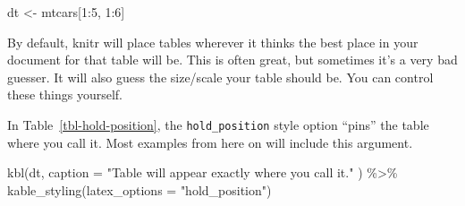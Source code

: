 \documentclass[
  letterpaper,
  DIV=11,
  numbers=noendperiod]{scrartcl}
\newenvironment{Shaded}{\begin{snugshade}}{\end{snugshade}}
\newcommand{\AttributeTok}[1]{\textcolor[rgb]{0.40,0.45,0.13}{#1}}
\newcommand{\DecValTok}[1]{\textcolor[rgb]{0.68,0.00,0.00}{#1}}
\newcommand{\FunctionTok}[1]{\textcolor[rgb]{0.28,0.35,0.67}{#1}}
\newcommand{\NormalTok}[1]{\textcolor[rgb]{0.00,0.23,0.31}{#1}}
\newcommand{\OtherTok}[1]{\textcolor[rgb]{0.00,0.23,0.31}{#1}}
\newcommand{\SpecialCharTok}[1]{\textcolor[rgb]{0.37,0.37,0.37}{#1}}
\newcommand{\StringTok}[1]{\textcolor[rgb]{0.13,0.47,0.30}{#1}}
\begin{document}
\begin{Shaded}
\begin{Highlighting}[]
\NormalTok{dt }\OtherTok{\textless{}{-}}\NormalTok{ mtcars[}\DecValTok{1}\SpecialCharTok{:}\DecValTok{5}\NormalTok{, }\DecValTok{1}\SpecialCharTok{:}\DecValTok{6}\NormalTok{]}
\end{Highlighting}
\end{Shaded}

By default, knitr will place tables wherever it thinks the best place in
your document for that table will be. This is often great, but sometimes
it's a very bad guesser. It will also guess the size/scale your table
should be. You can control these things yourself.

In Table~\ref{tbl-hold-position}, the \texttt{hold\_position} style
option ``pins'' the table where you call it. Most examples from here on
will include this argument.

\begin{Shaded}
\begin{Highlighting}[]
\FunctionTok{kbl}\NormalTok{(dt, }
    \AttributeTok{caption =} \StringTok{"Table will appear exactly where you call it."}
\NormalTok{    ) }\SpecialCharTok{\%\textgreater{}\%}
  \FunctionTok{kable\_styling}\NormalTok{(}\AttributeTok{latex\_options =} \StringTok{"hold\_position"}\NormalTok{)}
\end{Highlighting}
\end{Shaded}

\begin{table}

\caption{\label{tbl-hold-position}}


\end{table}%
\end{document}
